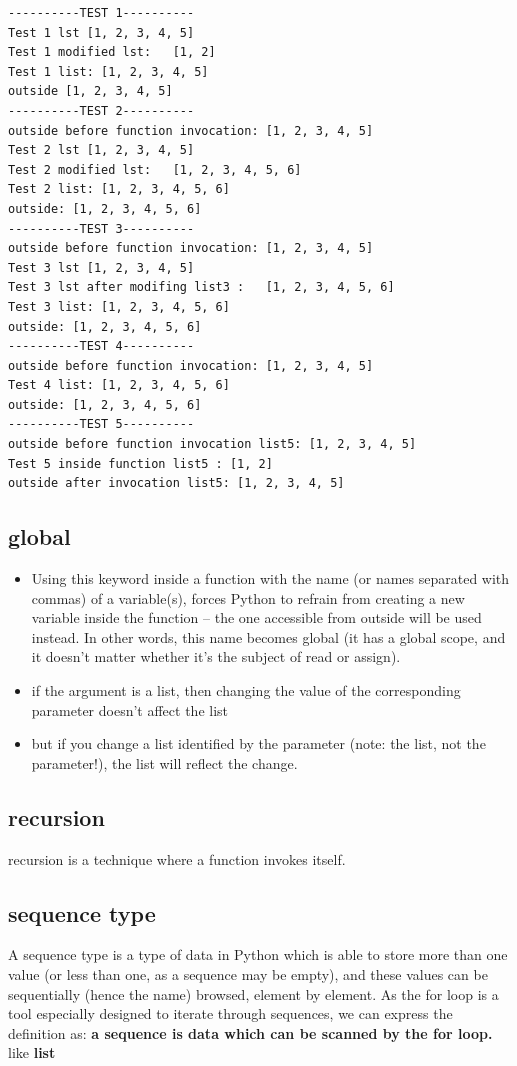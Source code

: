 \documentclass[11pt]{article}
\begin{document}
\begin{verbatim}
----------TEST 1----------
Test 1 lst [1, 2, 3, 4, 5]
Test 1 modified lst:   [1, 2]
Test 1 list: [1, 2, 3, 4, 5]
outside [1, 2, 3, 4, 5]
----------TEST 2----------
outside before function invocation: [1, 2, 3, 4, 5]
Test 2 lst [1, 2, 3, 4, 5]
Test 2 modified lst:   [1, 2, 3, 4, 5, 6]
Test 2 list: [1, 2, 3, 4, 5, 6]
outside: [1, 2, 3, 4, 5, 6]
----------TEST 3----------
outside before function invocation: [1, 2, 3, 4, 5]
Test 3 lst [1, 2, 3, 4, 5]
Test 3 lst after modifing list3 :   [1, 2, 3, 4, 5, 6]
Test 3 list: [1, 2, 3, 4, 5, 6]
outside: [1, 2, 3, 4, 5, 6]
----------TEST 4----------
outside before function invocation: [1, 2, 3, 4, 5]
Test 4 list: [1, 2, 3, 4, 5, 6]
outside: [1, 2, 3, 4, 5, 6]
----------TEST 5----------
outside before function invocation list5: [1, 2, 3, 4, 5]
Test 5 inside function list5 : [1, 2]
outside after invocation list5: [1, 2, 3, 4, 5]
\end{verbatim}

\subsection{global}
\label{sec:org0e595bc}
\begin{itemize}
\item Using this keyword inside a function with the name (or names
separated with commas) of a variable(s), forces Python to refrain
from creating a new variable inside the function – the one accessible
from outside will be used instead. In other words, this name becomes
global (it has a global scope, and it doesn’t matter whether it’s the
subject of read or assign).
\item if the argument is a list, then changing the value of the
corresponding parameter doesn’t affect the list
\item but if you change a list identified by the parameter (note: the
list, not the parameter!), the list will reflect the change.
\end{itemize}

\subsection{recursion}
\label{sec:org68a752c}
recursion is a technique where a function invokes itself.
\subsection{sequence type}
\label{sec:orgafee9aa}
A sequence type is a type of data in Python which is able to store
more than one value (or less than one, as a sequence may be empty),
and these values can be sequentially (hence the name) browsed,
element by element. As the for loop is a tool especially designed to
iterate through sequences, we can express the definition as:
\textbf{a sequence is data which can be scanned by the for loop.} like \textbf{list}
\end{document}
